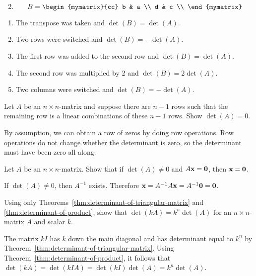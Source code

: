 \begin{enumialphparenastyle}
\begin{ex}
\begin{enumerate}
\begin{equation*}
    \end{equation*}
  \item
    \begin{equation*}
      B = \begin{mymatrix}{cc}
        b & a \\
        d & c \\
      \end{mymatrix}
    \end{equation*}
  \end{enumerate}
  \begin{sol}
    \begin{enumerate}
    \item The transpose was taken and $\det(B) = \det(A)$.
    \item Two rows were switched and $\det(B) = -\det(A)$.
    \item The first row was added to the second row and $\det(B) = \det(A)$. 
    \item The second row was multiplied by 2 and $\det(B) = 2\det(A)$.
    \item Two columns were switched and $\det(B) = -\det(A)$. 
    \end{enumerate}
  \end{sol}
\end{ex}

\begin{ex}
  Let $A$ be an $n\times n$-matrix and suppose there are $n-1$ rows
  such that the remaining row is a linear combinations of these $n-1$
  rows. Show $\det(A) = 0$.
  \begin{sol}
    By assumption, we can obtain a row of zeros by doing row
    operations. Row operations do not change whether the determinant
    is zero, so the determinant must have been zero all along.
  \end{sol}
\end{ex}

\begin{ex}
  \label{ex:determinant3}
  Let $A$ be an $n\times n$-matrix. Show that if $\det(A) \neq 0$ and
  $A\mbox{\bf x}=\mbox{\bf 0}$, then $\mbox{\bf x}=\mbox{\bf 0}$.
  \begin{sol}
    If $\det(A) \neq 0$, then $A^{-1}$ exists. Therefore
    $\mbox{\bf x} = A^{-1}A\mbox{\bf x} = A^{-1}\mbox{\bf 0} = \mbox{\bf 0}$.
  \end{sol}
\end{ex}

\begin{ex}
  Using only Theorems~\ref{thm:determinant-of-triangular-matrix} and
  {\ref{thm:determinant-of-product}}, show that
  $\det(kA) = k^{n}\det(A)$ for an $n\times n$-matrix $A$ and scalar
  $k$.
  \begin{sol}
    The matrix $kI$ has $k$ down the main diagonal and has determinant
    equal to $k^{n}$ by
    Theorem~\ref{thm:determinant-of-triangular-matrix}. Using
    Theorem~\ref{thm:determinant-of-product}, it follows that
    $\det(kA) = \det(kIA) = \det(kI) \det(A) = k^{n}\det(A)$.
  \end{sol}
\end{ex}


\end{enumialphparenastyle}
